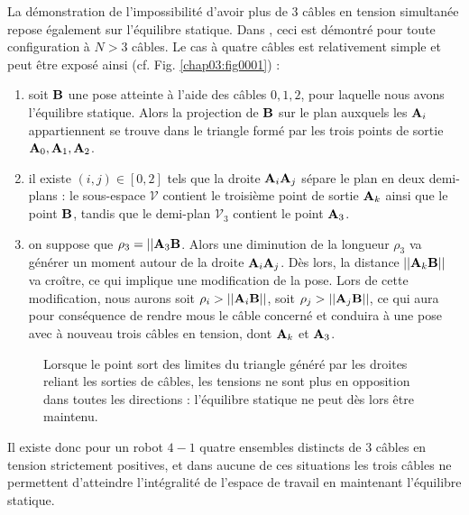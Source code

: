 La démonstration de l'impossibilité d'avoir plus de $3$ câbles en tension 
simultanée repose également sur l'équilibre statique. Dans \cite{merlet2012}, 
ceci est démontré pour toute configuration à $N > 3$ câbles. Le cas à quatre 
câbles est relativement simple et peut être exposé ainsi (cf. 
Fig. \ref{chap03:fig0001}) :
\begin{enumerate}
 \item soit ${\bf B}$ une pose atteinte \`a l'aide des c\^ables $0,1,2$, pour 
laquelle nous avons l'\'equilibre statique. Alors la projection de ${\bf B}$ 
sur le plan auxquels les ${\bf A}_i$ appartiennent se trouve dans le triangle 
form\'e par les trois points de sortie ${\bf A}_0, {\bf A}_1, {\bf A}_2$.
\item il existe $(i,j) \in [0,2]$ tels que la droite ${\bf A}_i{\bf A}_j$ 
s\'epare le plan en deux demi-plans : le sous-espace $\mathcal V$ contient le 
troisi\`eme point de sortie ${\bf A}_k$ ainsi que le point ${\bf B}$, tandis 
que le demi-plan $\mathcal V_3$ contient le point ${\bf A}_3$.
\item on suppose que $\rho_3 = ||{\bf A}_3{\bf B}$. Alors une diminution de la 
longueur $\rho_3$ va g\'en\'erer un moment autour de la droite ${\bf A}_i{\bf 
A}_j$. D\`es lors, la distance $||{\bf A}_k{\bf B}||$ va cro\^itre, ce qui 
implique une modification de la pose. Lors de cette modification, nous aurons 
soit $\rho_i > ||{\bf A}_i{\bf B}||$, soit $\rho_j > ||{\bf A}_j{\bf B}||$, ce 
qui aura pour cons\'equence de rendre mous le c\^able concern\'e et conduira 
\`a une pose avec \`a nouveau trois c\^ables en tension, dont ${\bf A}_k$ et 
${\bf A}_3$.
\end{enumerate}

\begin{figure}[!ht]
  \centering
    \def\svgwidth{.65\linewidth}
  
    \caption{\footnotesize{Lorsque le point sort des limites du triangle généré 
par les droites reliant les sorties de câbles, les tensions ne sont plus en 
opposition dans toutes les directions : l'équilibre statique ne peut dès lors 
être maintenu.}}
\label{chap03:fig0000}
\end{figure}

Il existe donc pour un robot $4-1$ quatre ensembles distincts de 3 câbles en 
tension strictement positives, et dans aucune de ces situations les trois 
câbles ne permettent d'atteindre l'intégralité de l'espace de travail en 
maintenant l'équilibre statique.

